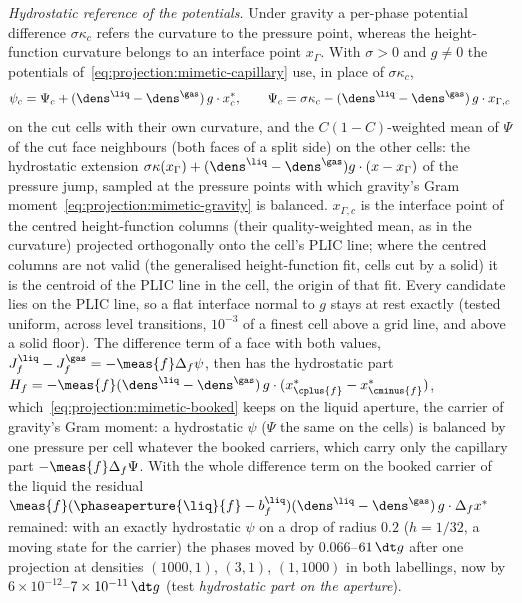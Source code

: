 \emph{Hydrostatic reference of the potentials.} Under gravity a per-phase
potential difference $\sigma\kappa_c$ refers the curvature to the pressure
point, whereas the height-function curvature belongs to an interface point
$x_\Gamma$. With $\sigma>0$ and $g\neq0$ the potentials
of~\cref{eq:projection:mimetic-capillary} use, in place of $\sigma\kappa_c$,
\begin{equation}\label{eq:projection:mimetic-hydrostatic}
  \psi_c=\Psi_c+(\dens^{\liq}-\dens^{\gas})\,g\cdot x^{*}_c,\qquad
  \Psi_c=\sigma\kappa_c-(\dens^{\liq}-\dens^{\gas})\,g\cdot x_{\Gamma,c}
\end{equation}
on the cut cells with their own curvature, and the $C(1-C)$-weighted mean of
$\Psi$ of the cut face neighbours (both faces of a split side) on the other
cells: the hydrostatic extension $\sigma\kappa(x_\Gamma)+(\dens^{\liq}-\dens^{\gas})g\cdot(x-x_\Gamma)$
of the pressure jump, sampled at the pressure points with which gravity's Gram
moment~\cref{eq:projection:mimetic-gravity} is balanced. $x_{\Gamma,c}$ is the
interface point of the centred height-function columns (their quality-weighted
mean, as in the curvature) projected orthogonally onto the cell's PLIC line;
where the centred columns are not valid (the generalised height-function fit,
cells cut by a solid) it is the centroid of the PLIC line in the cell, the
origin of that fit. Every candidate lies on the PLIC line, so a flat interface
normal to $g$ stays at rest exactly (tested uniform, across level transitions,
$10^{-3}$ of a finest cell above a grid line, and above a solid floor).
The difference term of a face with both values,
$J^{\liq}_f-J^{\gas}_f=-\meas{f}\Delta_f\psi$, then has the hydrostatic part
$H_f=-\meas{f}(\dens^{\liq}-\dens^{\gas})\,g\cdot(x^{*}_{\cplus{f}}-x^{*}_{\cminus{f}})$,
which~\cref{eq:projection:mimetic-booked} keeps on the liquid aperture, the
carrier of gravity's Gram moment: a hydrostatic $\psi$ ($\Psi$ the same on the
cells) is balanced by one pressure per cell whatever the booked carriers, which
carry only the capillary part $-\meas{f}\Delta_f\Psi$. With the whole
difference term on the booked carrier of the liquid the residual
$\meas{f}(\phaseaperture{\liq}{f}-b^{\liq}_f)(\dens^{\liq}-\dens^{\gas})\,g\cdot\Delta_fx^{*}$
remained: with an exactly hydrostatic $\psi$ on a drop of radius $0.2$
($h=1/32$, a moving state for the carrier) the phases moved by
$0.066$--$61\,\dt g$ after one projection at densities $(1000,1)$, $(3,1)$,
$(1,1000)$ in both labellings, now by $6\times10^{-12}$--$7\times10^{-11}\,\dt g$
(test \emph{hydrostatic part on the aperture}).
